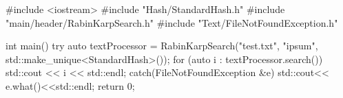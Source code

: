 #include <iostream>
#include "Hash/StandardHash.h"
#include "main/header/RabinKarpSearch.h"
#include "Text/FileNotFoundException.h"

int main()
{
    try {
        auto textProcessor = RabinKarpSearch("test.txt", "ipsum",
        std::make_unique<StandardHash>());
        for (auto i : textProcessor.search()) {
            std::cout << i << std::endl;
        }
    } catch(FileNotFoundException &e) {std::cout<< e.what()<<std::endl;}
    return 0;
}